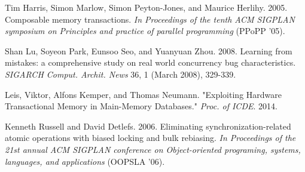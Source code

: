 \documentclass{sigplanconf}
\begin{document}
\begin{thebibliography}{}
  Tim Harris, Simon Marlow, Simon Peyton-Jones, and Maurice
  Herlihy. 2005. Composable memory transactions. \emph{In Proceedings
    of the tenth ACM SIGPLAN symposium on Principles and practice of
    parallel programming} (PPoPP '05).

  Shan Lu, Soyeon Park, Eunsoo Seo, and Yuanyuan Zhou. 2008. Learning
  from mistakes: a comprehensive study on real world concurrency bug
  characteristics. \emph{SIGARCH Comput. Archit. News} 36, 1 (March 2008),
  329-339.

  Leis, Viktor, Alfons Kemper, and Thomas Neumann. "Exploiting
  Hardware Transactional Memory in Main-Memory Databases."
  \emph{Proc. of ICDE}. 2014.

  Kenneth Russell and David Detlefs. 2006. Eliminating
  synchronization-related atomic operations with biased locking and
  bulk rebiasing. \emph{In Proceedings of the 21st annual ACM SIGPLAN
    conference on Object-oriented programing, systems, languages, and
    applications} (OOPSLA '06).

\end{thebibliography}
\end{document}
